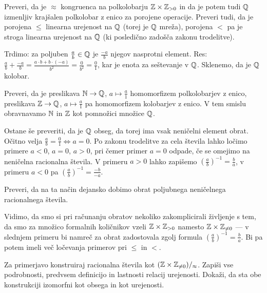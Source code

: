 \begin{naloga}
Preveri, da je $\approx$ kongruenca na polkolobarju $\mathbb{Z} \times \mathbb{Z}_{> 0}$ in da je potem tudi $\mathbb{Q}$ izmenljiv krajšalen polkolobar z enico za porojene operacije. Preveri tudi, da je porojena $\leq$ linearna urejenost na $\mathbb{Q}$ (torej je $\mathbb{Q}$ mreža), porojena $<$ pa je stroga linearna urejenost na $\mathbb{Q}$ (ki posledično zadošča zakonu trodelitve).
\end{naloga}

Trdimo: za poljuben $\frac{a}{b} \in \mathbb{Q}$ je $\frac{-a}{b}$ njegov nasprotni element. Res: $\frac{a}{b} + \frac{-a}{b} = \frac{a \cdot b + b \cdot (-a)}{b^2} = \frac{0}{b^2} = \frac{0}{1}$, kar je enota za seštevanje v $\mathbb{Q}$. Sklenemo, da je $\mathbb{Q}$ kolobar.

\begin{naloga}
Preveri, da je preslikava $\mathbb{N} \to \mathbb{Q}$, $a \mapsto \frac{a}{1}$ homomorfizem polkolobarjev z enico, preslikava $\mathbb{Z} \to \mathbb{Q}$, $a \mapsto \frac{a}{1}$ pa homomorfizem kolobarjev z enico. V tem smislu obravnavamo $\mathbb{N}$ in $\mathbb{Z}$ kot pomnožici množice $\mathbb{Q}$.
\end{naloga}

Ostane še preveriti, da je $\mathbb{Q}$ obseg, da torej ima vsak neničelni element obrat. Očitno velja $\frac{a}{b} = \frac{0}{1} \iff a = 0$. Po zakonu trodelitve za cela števila lahko ločimo primere $a < 0$, $a = 0$, $a > 0$, pri čemer primer $a = 0$ odpade, če se omejimo na neničelna racionalna števila. V primeru $a > 0$ lahko zapišemo $(\frac{a}{b})^{-1} = \frac{b}{a}$, v primeru $a < 0$ pa $(\frac{a}{b})^{-1} = \frac{-b}{-a}$.

\begin{naloga}
Preveri, da na ta način dejansko dobimo obrat poljubnega neničelnega racionalnega števila.
\end{naloga}

Vidimo, da smo si pri računanju obratov nekoliko zakomplicirali življenje s tem, da smo za množico formalnih količnikov vzeli $\mathbb{Z} \times \mathbb{Z}_{> 0}$ namesto $\mathbb{Z} \times \mathbb{Z}_{\neq 0}$ --- v slednjem primeru bi namreč za obrat zadostovala zgolj formula $(\frac{a}{b})^{-1} = \frac{b}{a}$. Bi pa potem imeli več ločevanja primerov pri $\leq$ in $<$.

\begin{naloga}
Za primerjavo konstruiraj racionalna števila kot $(\mathbb{Z} \times \mathbb{Z}_{\neq 0})/_\approx$. Zapiši vse podrobnosti, predvsem definicijo in lastnosti relacij urejenosti. Dokaži, da sta obe konstrukciji izomorfni kot obsega in kot urejenosti.
\end{naloga}

